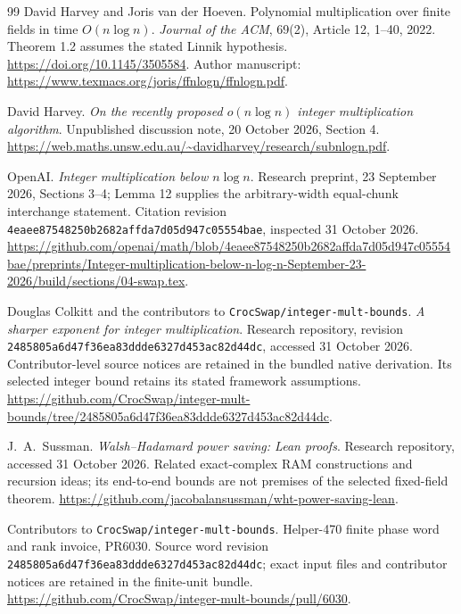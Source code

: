 \documentclass[11pt]{article}
\theoremstyle{definition}
\begin{document}
\begin{thebibliography}{99}
David Harvey and Joris van der Hoeven.
\newblock Polynomial multiplication over finite fields in time $O(n\log n)$.
\newblock \emph{Journal of the ACM}, 69(2), Article 12, 1--40, 2022.
\newblock Theorem 1.2 assumes the stated Linnik hypothesis.
\newblock \url{https://doi.org/10.1145/3505584}.
\newblock Author manuscript: \url{https://www.texmacs.org/joris/ffnlogn/ffnlogn.pdf}.

David Harvey.
\newblock \emph{On the recently proposed $o(n\log n)$ integer multiplication algorithm}.
\newblock Unpublished discussion note, 20 October 2026, Section 4.
\newblock \url{https://web.maths.unsw.edu.au/~davidharvey/research/subnlogn.pdf}.

OpenAI.
\newblock \emph{Integer multiplication below $n\log n$}.
\newblock Research preprint, 23 September 2026, Sections 3--4;
Lemma 12 supplies the arbitrary-width equal-chunk interchange statement.
\newblock Citation revision \texttt{4eaee87548250b2682affda7d05d947c05554bae}, inspected 31 October 2026.
\newblock \url{https://github.com/openai/math/blob/4eaee87548250b2682affda7d05d947c05554bae/preprints/Integer-multiplication-below-n-log-n-September-23-2026/build/sections/04-swap.tex}.

Douglas Colkitt and the contributors to \texttt{CrocSwap/integer-mult-bounds}.
\newblock \emph{A sharper exponent for integer multiplication}.
\newblock Research repository, revision \texttt{2485805a6d47f36ea83ddde6327d453ac82d44dc},
accessed 31 October 2026. Contributor-level source notices are retained
in the bundled native derivation. Its selected integer bound retains
its stated framework assumptions.
\newblock \url{https://github.com/CrocSwap/integer-mult-bounds/tree/2485805a6d47f36ea83ddde6327d453ac82d44dc}.

J.~A.~Sussman.
\newblock \emph{Walsh--Hadamard power saving: Lean proofs}.
\newblock Research repository, accessed 31 October 2026.
Related exact-complex RAM constructions and recursion ideas; its
end-to-end bounds are not premises of the selected fixed-field theorem.
\newblock \url{https://github.com/jacobalansussman/wht-power-saving-lean}.

Contributors to \texttt{CrocSwap/integer-mult-bounds}.
\newblock Helper-470 finite phase word and rank invoice, PR6030.
\newblock Source word revision
\texttt{2485805a6d47f36ea83ddde6327d453ac82d44dc};
exact input files and contributor notices are retained in the finite-unit bundle.
\newblock \url{https://github.com/CrocSwap/integer-mult-bounds/pull/6030}.


\end{thebibliography}
\end{document}
